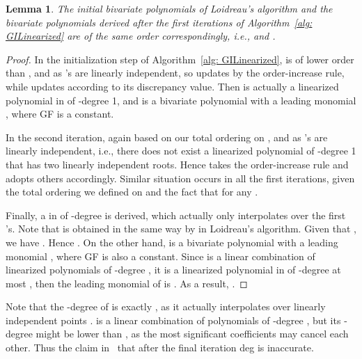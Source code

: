 \documentclass[11pt,onecolumn,draftcls]{IEEEtran}
\newtheorem{lemma}{Lemma}
\begin{document}
\begin{lemma} \label{Lemma: LdGIkit}
The initial bivariate polynomials of Loidreau's algorithm and the bivariate polynomials derived after the first  iterations of Algorithm~\ref{alg: GILinearized} are of the same order correspondingly, i.e.,  and .
\end{lemma}
\begin{proof}
 In the initialization step of Algorithm~\ref{alg: GILinearized},  is of lower order than , and  as 's are linearly independent, so  updates by the order-increase rule, while  updates according to its discrepancy value. Then  is actually a linearized polynomial in  of -degree 1, and  is a bivariate polynomial with a leading monomial , where  GF is a constant.

 In the second iteration, again  based on our total ordering on , and  as 's are linearly independent, i.e., there does not exist a linearized polynomial of -degree 1 that has two linearly independent roots. Hence  takes the order-increase rule and  adopts others accordingly. Similar situation occurs in all the first  iterations, given the total ordering we defined on  and the fact that  for any .

 Finally, a  in  of -degree  is derived, which actually only interpolates over the first  's. Note that  is obtained in the same way by  in Loidreau's algorithm. Given that ,  we have . Hence . On the other hand,  is a bivariate polynomial with a leading monomial , where  GF is also a constant. Since  is a linear combination of linearized polynomials of -degree , it is a linearized polynomial in  of -degree at most , then the leading monomial of  is . As a result, .
\end{proof}
Note that the -degree of  is exactly , as it actually interpolates over  linearly independent points .  is a linear combination of polynomials of -degree , but its -degree might be lower than , as the most significant coefficients may cancel each other. Thus the claim in~\cite{loidreau_wcc05} that after the final iteration deg is inaccurate.
\end{document}
